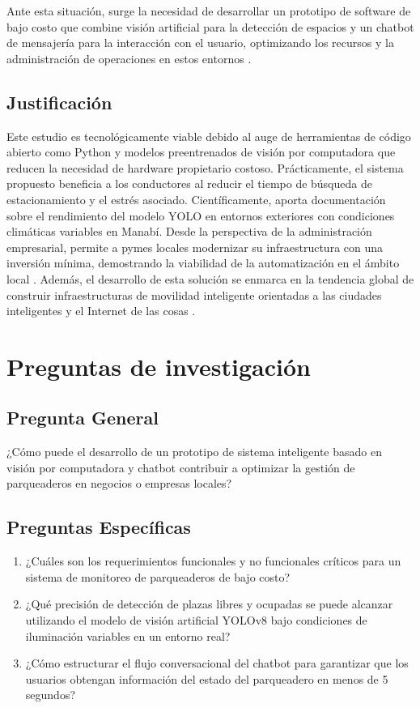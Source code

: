Ante esta situación, surge la necesidad de desarrollar un prototipo de software de bajo costo que combine visión artificial para la detección de espacios y un chatbot de mensajería para la interacción con el usuario, optimizando los recursos y la administración de operaciones en estos entornos \parencite{HeizerRender2020}.

\subsection{Justificación}

Este estudio es tecnológicamente viable debido al auge de herramientas de código abierto como Python y modelos preentrenados de visión por computadora que reducen la necesidad de hardware propietario costoso. Prácticamente, el sistema propuesto beneficia a los conductores al reducir el tiempo de búsqueda de estacionamiento y el estrés asociado. Científicamente, aporta documentación sobre el rendimiento del modelo YOLO en entornos exteriores con condiciones climáticas variables en Manabí. Desde la perspectiva de la administración empresarial, permite a pymes locales modernizar su infraestructura con una inversión mínima, demostrando la viabilidad de la automatización en el ámbito local \parencite{Chiavenato2017}. Además, el desarrollo de esta solución se enmarca en la tendencia global de construir infraestructuras de movilidad inteligente orientadas a las ciudades inteligentes y el Internet de las cosas \parencite{Lopez2022}.

\section{Preguntas de investigación}

\subsection{Pregunta General}
¿Cómo puede el desarrollo de un prototipo de sistema inteligente basado en visión por computadora y chatbot contribuir a optimizar la gestión de parqueaderos en negocios o empresas locales?

\subsection{Preguntas Específicas}
\begin{enumerate}
    \item ¿Cuáles son los requerimientos funcionales y no funcionales críticos para un sistema de monitoreo de parqueaderos de bajo costo?
    \item ¿Qué precisión de detección de plazas libres y ocupadas se puede alcanzar utilizando el modelo de visión artificial YOLOv8 bajo condiciones de iluminación variables en un entorno real?
    \item ¿Cómo estructurar el flujo conversacional del chatbot para garantizar que los usuarios obtengan información del estado del parqueadero en menos de 5 segundos?
\end{enumerate}

